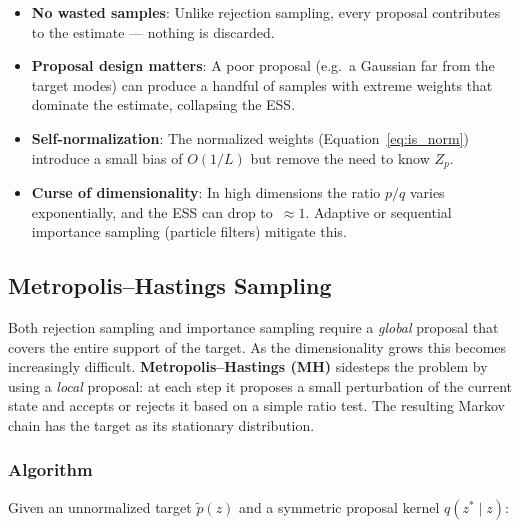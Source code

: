 \documentclass[12pt, a4paper]{article}
\begin{document}
\begin{itemize}
    \item \textbf{No wasted samples}: Unlike rejection sampling, every
          proposal contributes to the estimate — nothing is discarded.
    \item \textbf{Proposal design matters}: A poor proposal (e.g.\ a
          Gaussian far from the target modes) can produce a handful of
          samples with extreme weights that dominate the estimate,
          collapsing the ESS.
    \item \textbf{Self-normalization}: The normalized weights
          (Equation~\ref{eq:is_norm}) introduce a small bias of
          $O(1/L)$ but remove the need to know $Z_p$.
    \item \textbf{Curse of dimensionality}: In high dimensions the
          ratio $p/q$ varies exponentially, and the ESS can drop
          to~$\approx 1$.  Adaptive or sequential importance sampling
          (particle filters) mitigate this.
\end{itemize}

\subsection{Metropolis--Hastings Sampling}
\label{sec:mh}

Both rejection sampling and importance sampling require a
\emph{global} proposal that covers the entire support of the target.
As the dimensionality grows this becomes increasingly difficult.
\textbf{Metropolis--Hastings (MH)} sidesteps the problem by using a
\emph{local} proposal: at each step it proposes a small perturbation
of the current state and accepts or rejects it based on a simple
ratio test.  The resulting Markov chain has the target as its
stationary distribution.

\subsubsection{Algorithm}

Given an unnormalized target $\tilde{p}(z)$ and a symmetric proposal
kernel $q(z^* \mid z)$:
\end{document}
